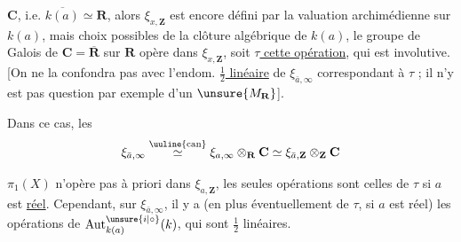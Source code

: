 $\mathbf C$, i.e. $\overline{k(a)}\simeq\mathbf R$,  alors $\xi_{x,\mathbf Z}$ est encore défini par la valuation archimédienne sur $k(a)$, mais    choix possibles de la clôture algébrique de $k(a)$, le groupe de Galois de $\mathbf C=\overline{\mathbf R}$ sur $\mathbf R$ opère dans $\xi_{x,\mathbf Z}$, soit \uline{$\tau$ cette opération}, qui est involutive.  [On ne la confondra pas avec l'endom. \uline{$\frac12$ linéaire} de $\xi_{\bar a,\infty}$ correspondant à $\tau$ ; il n'y est pas question par exemple d'un  $\unsure{M_{\mathbf R}}$].


Dans ce cas, les  
\[
\xi_{\bar a,\infty}\overset{\text{\uuline{can}}}{\simeq}\xi_{a,\infty}\otimes_{\mathbf R}\mathbf C
\simeq\xi_{\bar a,\mathbf Z}\otimes_{\mathbf Z}\mathbf C
\]

$\pi_1(X)$ n'opère pas à priori dans $\xi_{a,\mathbf Z}$, les seules opérations sont celles de $\tau$ si $a$ est \uline{réel}. Cependant, sur $\xi_{\bar a,\infty}$, il y a (en plus éventuellement de $\tau$, si $a$ est réel) les opérations de $\operatorname{Aut}_{k(a)}^{\unsure{i|\circ}}(k)$, qui sont $\frac12$ linéaires.
